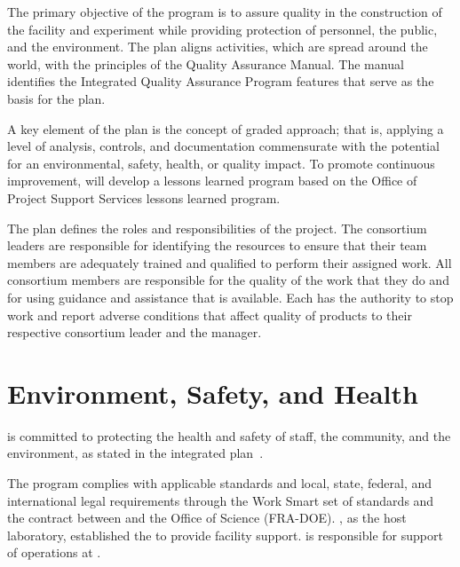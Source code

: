 The primary objective of the   program is
to assure quality in the construction of the  facility and
 experiment while providing protection of
 personnel, the public, and the environment. The
 plan aligns   activities, which
are spread around the world, with the principles of the \fnal Quality
Assurance Manual. The manual identifies the \fnal Integrated Quality
Assurance Program features that serve as the basis for the
  plan.

A key element of the   plan is the
concept of graded approach; that is, applying a level of analysis,
controls, and documentation commensurate with the potential for an
environmental, safety, health, or quality impact. To promote continuous improvement,   will develop a
lessons learned program based on the \fnal Office of Project Support
Services lessons learned program.


The  plan
defines the  roles and responsibilities of the 
project. The  consortium leaders are responsible for identifying the
resources to ensure that their team members are adequately trained and
qualified to perform their assigned work.
All consortium members are responsible for the quality of the work that
they do and for using guidance and assistance that is available. Each
has the authority to stop work and report adverse conditions that
affect quality of  products to their respective
 consortium leader and the 
 manager.




\section{Environment, Safety, and Health}
\label{sec:es-tc-eshq}

 is committed to protecting the health and safety of
staff, the community, and the environment, as stated in the
 integrated  plan~\cite{bib:docdb291}.

The   program complies with applicable
standards and local, state, federal, and international legal
requirements through the  Work Smart set of standards and the
contract between  and the 
Office of Science (FRA-DOE). \fnal, as the host laboratory,
established the  to provide facility support.
 is responsible for support of 
operations at .

